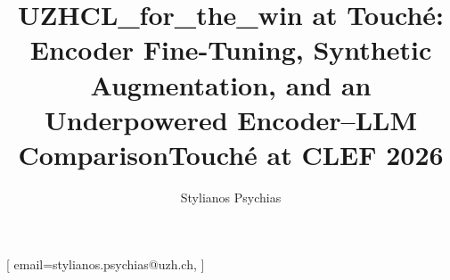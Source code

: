 \documentclass{ceurart}
\begin{document}
\title{UZHCL\_for\_the\_win at Touch\'{e}: Encoder Fine-Tuning, Synthetic Augmentation, and an Underpowered Encoder--LLM Comparison}
\title[mode=sub]{Touch\'{e} at CLEF 2026}

\author[1]{Stylianos Psychias}[%
  email=stylianos.psychias@uzh.ch,
]
\address[1]{University of Zurich, Zurich, Switzerland}

\end{document}
